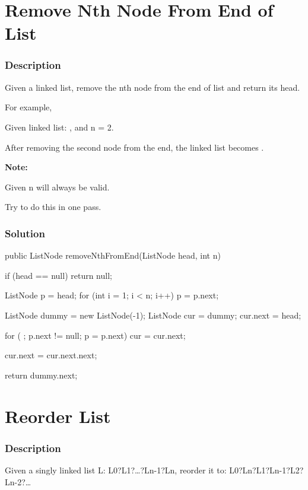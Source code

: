 \section{Remove Nth Node From End of List} %

\subsubsection{Description}
Given a linked list, remove the nth node from the end of list and return its head.

For example,

   Given linked list: , and n = 2.

   After removing the second node from the end, the linked list becomes .

\textbf{Note:}

Given n will always be valid.

Try to do this in one pass.

\subsubsection{Solution}

\begin{Code}
public ListNode removeNthFromEnd(ListNode head, int n) {
    if (head == null) {
        return null;
    }

    ListNode p = head;
    for (int i = 1; i < n; i++) {
        p = p.next;
    }

    ListNode dummy = new ListNode(-1);
    ListNode cur = dummy;
    cur.next = head;

    for ( ; p.next != null; p = p.next) {
        cur = cur.next;
    }

    cur.next = cur.next.next;

    return dummy.next;
}
\end{Code}

\newpage

\section{Reorder List} %

\subsubsection{Description}
Given a singly linked list L: L0?L1?…?Ln-1?Ln,
reorder it to: L0?Ln?L1?Ln-1?L2?Ln-2?…

